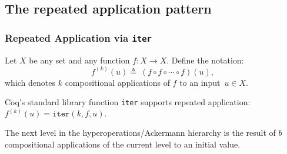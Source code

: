 \subsection{The repeated application pattern}

\begin{frame}
\frametitle{Repeated Application via \texttt{iter}}

Let $X$ be any set and any function $f: X\to X$. Define the notation:
\begin{equation*}
f^{(k)}(u) \triangleq ~ (f\circ f\circ \cdots \circ f)(u),
\end{equation*}
which denotes $k$ compositional applications of $f$ to an
input~$u\in X$.

\bigskip

Coq's standard library function \texttt{iter} supports repeated application:
$f^{(k)}(u) = \texttt{iter}(k, f, u).$

\bigskip

The next level in the hyperoperations/Ackermann hierarchy is the result of $b$ compositional applications of the current level to an initial value.


%
%

\end{frame}


